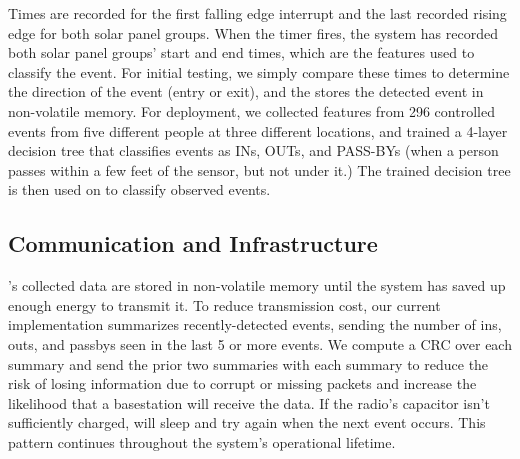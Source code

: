Times are recorded for the first falling edge interrupt and the last recorded rising edge for both solar panel groups.
When the timer fires, the system has recorded both solar panel groups' start and end times, which are the features used to classify the event.
For initial testing, we simply compare these times to determine the direction of the event (entry or exit), and the \sysname stores the detected event in non-volatile memory.
For deployment, we collected features from 296 controlled events from five different people at three different locations, and trained a 4-layer decision tree that classifies events as INs, OUTs, and PASS-BYs (when a person passes within a few feet of the sensor, but not under it.)
%
%
The trained decision tree is then used on \sysname to classify observed events. 


\subsection{Communication and Infrastructure}
\sysname's collected data are stored in non-volatile memory until the system has saved up enough energy to transmit it.
To reduce transmission cost, our current implementation summarizes recently-detected events, sending the number of ins, outs, and passbys seen in the last 5 or more events.
We compute a CRC over each summary and send the prior two summaries with each summary to reduce the risk of losing information due to corrupt or missing packets and increase the likelihood that a basestation will receive the data. 
If the radio's capacitor isn't sufficiently charged, \sysname will sleep and try again when the next event occurs.
This pattern continues throughout the system's operational lifetime.


